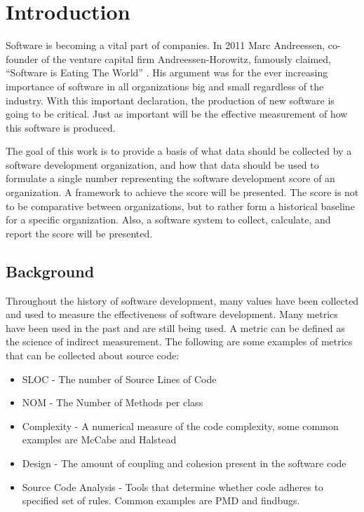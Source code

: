 \documentclass[SDSUThesis.tex]{subfiles}
\begin{document}
\newpage
{}
\setcounter{tocdepth}{2}

\section{Introduction}

Software is becoming a vital part of companies. In 2011 Marc Andreessen, co-founder of the venture capital firm Andreessen-Horowitz,
famously claimed, ``Software is Eating The World'' \cite{Andreessen2001}. His argument was for the ever increasing importance of software
in all organizations big and small regardless of the industry.  With this important declaration, the production of new software is
going to be critical.  Just as important will be the effective measurement of how this software is produced.  

The goal of this work is to provide a basis of what data should be collected by a software development organization, and how that data
should be used to formulate a single number representing the software development score of an organization. A framework to 
achieve the score will be presented.  The  score
is not to be comparative between organizations, but to rather form a historical baseline for a specific organization.  Also, a software
system to collect, calculate, and report the score will be presented.

\subsection{Background}

Throughout the history of software development, many values have been collected and used to measure the effectiveness of software development. 
Many metrics have been used in the past and are still being used.  A metric can be defined as the science of indirect measurement.
The following are some examples of metrics that can be collected about source code:
\begin{itemize}
\item SLOC - The number of Source Lines of Code 
\item NOM - The Number of Methods per class
\item Complexity - A numerical measure of the code complexity, some common examples are McCabe \cite{McCabe1976} and Halstead \cite{Halstead1977}
\item Design - The amount of coupling and cohesion present in the software code
\item Source Code Analysis - Tools that determine whether code adheres to specified set of rules. Common examples are PMD and findbugs.
\end{itemize}
\end{document}
